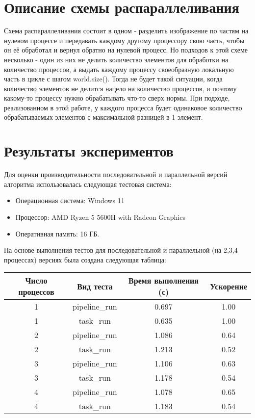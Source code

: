 \documentclass[a4paper,12pt]{article}
\begin{document}
\section{Описание схемы распараллеливания}
Схема распараллеливания состоит в одном - разделить изображение по частям на нулевом процессе и передавать каждому другому процессору свою часть, чтобы он её обработал и вернул обратно на нулевой процесс. Но подходов к этой схеме несколько - один из них не делить количество элементов для обработки на количество процессов, а выдать каждому процессу своеобразную локальную часть в цикле с шагом world.size(). Тогда не будет такой ситуации, когда количество элементов не делится нацело на количество процессов,  и поэтому какому-то процессу нужно обрабатывать что-то сверх нормы. При подходе, реализованном в этой работе, у каждого процесса будет одинаковое количество обрабатываемых элементов с максимальной разницей в 1 элемент.
\newpage

\section{Результаты экспериментов}
Для оценки производительности последовательной и параллельной версий алгоритма использовалась следующая тестовая система:
\begin{itemize}
    \item Операционная система: Windows 11
    \item Процессор: AMD Ryzen 5 5600H with Radeon Graphics
    \item Оперативная память: 16 ГБ.
\end{itemize}
На основе выполнения тестов для последовательной и параллельной (на 2,3,4 процессах) версиях была создана следующая таблица:\\[0,5cm]
\begin{tabular}{|c|c|c|c|}
    \hline
    Число процессов & Вид теста      & Время выполнения (с) & Ускорение \\ \hline
    1               & pipeline\_run & 0.697                & 1.00      \\ \hline
    1               & task\_run     & 0.635                & 1.00      \\ \hline
    2               & pipeline\_run & 1.086                & 0.64      \\ \hline
    2               & task\_run     & 1.213                & 0.52      \\ \hline
    3               & pipeline\_run & 1.106                & 0.63      \\ \hline
    3               & task\_run     & 1.178                & 0.54      \\ \hline
    4               & pipeline\_run & 1.078                & 0.65      \\ \hline
    4               & task\_run     & 1.183                & 0.54      \\ \hline
\end{tabular}
\newpage
\end{document}
